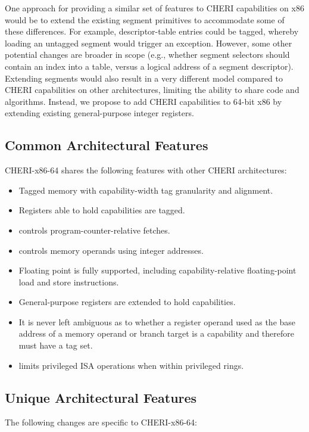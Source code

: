 One approach for providing a similar set of features to CHERI
capabilities on x86 would be to extend the existing segment primitives
to accommodate some of these differences.  For example, descriptor-table
entries could be tagged, whereby loading an untagged segment would trigger
an exception.  However, some other potential changes are broader in
scope (e.g., whether segment selectors should contain an index into a
table, versus a logical address of a segment descriptor).  Extending
segments would also result in a very different model compared to CHERI
capabilities on other architectures, limiting the ability to share code
and algorithms.  Instead, we propose to add CHERI capabilities to 64-bit
x86 by extending existing general-purpose integer registers.

\subsection{Common Architectural Features}

CHERI-x86-64 shares the following features with other CHERI
architectures:

\begin{itemize}
\item Tagged memory with capability-width tag granularity and alignment.
\item Registers able to hold capabilities are tagged.
\item \CIP{} controls program-counter-relative fetches.
\item \DDC{} controls memory operands using integer addresses.
\item Floating point is fully supported, including capability-relative
  floating-point load and store instructions.
\item General-purpose registers are extended to hold capabilities.
\item It is never left ambiguous as to whether a register operand used
  as the base address of a memory operand or branch target
  is a capability and therefore must have a tag set.
\item \cappermASR limits privileged ISA operations when within
  privileged rings.
\end{itemize}

\subsection{Unique Architectural Features}

The following changes are specific to CHERI-x86-64:


